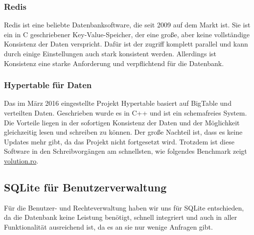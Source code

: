 \subsubsection{Redis}
Redis ist eine beliebte Datenbanksoftware, die seit 2009 auf dem Markt ist. Sie ist ein in C geschriebener Key-Value-Speicher, der eine große, aber keine vollständige Konsistenz der Daten verspricht. Dafür ist der zugriff komplett parallel und kann durch einige Einstellungen auch stark konsistent werden. Allerdings ist Konsistenz eine starke Anforderung und verpflichtend für die Datenbank.
\subsubsection{Hypertable für Daten}
Das im März 2016 eingestellte Projekt Hypertable basiert auf BigTable und verteilten Daten. Geschrieben wurde es in C++ und ist ein schemafreies System. Die Vorteile liegen in der sofortigen Konsistenz der Daten und der Möglichkeit gleichzeitig lesen und schreiben zu können. Der große Nachteil ist, dass es keine Updates mehr gibt, da das Projekt nicht fortgesetzt wird. Trotzdem ist diese Software in den Schreibvorgängen am schnellsten, wie folgendes Benchmark zeigt \href{https://wiki.volution.ro/Dehems/Benchmarks/Results}{volution.ro}.
\subsection{SQLite für Benutzerverwaltung}
Für die Benutzer- und Rechteverwaltung haben wir uns für SQLite entschieden, da die Datenbank keine Leistung benötigt, schnell integriert und auch in aller Funktionalität ausreichend ist, da es an sie nur wenige Anfragen gibt.

